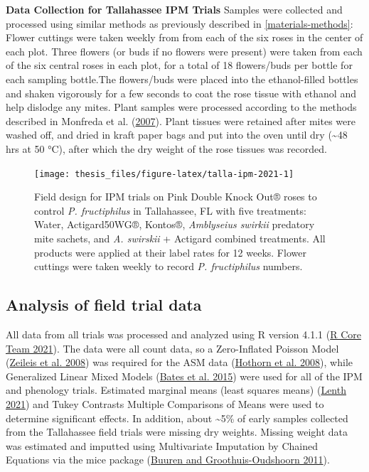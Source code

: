 \documentclass{ufdissertation}[overrideChapters] %
\begin{document}
{\textbf{Data Collection for Tallahassee IPM Trials}
Samples were collected and processed using similar methods as previously described in \ref{materials-methods}: Flower cuttings were taken weekly from from each of the six roses in the center of each plot. Three flowers (or buds if no flowers were present) were taken from each of the six central roses in each plot, for a total of 18 flowers/buds per bottle for each sampling bottle.The flowers/buds were placed into the ethanol-filled bottles and shaken vigorously for a few seconds to coat the rose tissue with ethanol and help dislodge any mites. Plant samples were processed according to the methods described in Monfreda et al. (\protect\hyperlink{ref-Monfreda2007}{2007}). Plant tissues were retained after mites were washed off, and dried in kraft paper bags and put into the oven until dry (\textasciitilde48 hrs at 50 °C), after which the dry weight of the rose tissues was recorded.
\begin{figure}

{\centering \texttt{[image: thesis\_files/figure-latex/talla-ipm-2021-1]} 

}

\caption[Field design for IPM trials on Pink Double Knock Out® roses to control \textit{P. fructiphilus} in Tallahassee, FL with five treatments]{Field design for IPM trials on Pink Double Knock Out® roses to control \textit{P. fructiphilus} in Tallahassee, FL with five treatments: Water, Actigard50WG®, Kontos®, \textit{Amblyseius swirkii} predatory mite sachets, and \textit{A. swirskii} + Actigard combined treatments. All products were applied at their label rates for 12 weeks. Flower cuttings were taken weekly to record \textit{P. fructiphilus} numbers.}\label{fig:talla-ipm-2021}
\end{figure}
\hypertarget{analysis-of-field-trial-data}{%
\subsection{Analysis of field trial data}\label{analysis-of-field-trial-data}}

All data from all trials was processed and analyzed using R version 4.1.1 (\protect\hyperlink{ref-RCT2021}{R Core Team 2021}). The data were all count data, so a Zero-Inflated Poisson Model (\protect\hyperlink{ref-Zeileis2008}{Zeileis et al. 2008}) was required for the ASM data (\protect\hyperlink{ref-Hothorn2008}{Hothorn et al. 2008}), while Generalized Linear Mixed Models (\protect\hyperlink{ref-Bates2015}{Bates et al. 2015}) were used for all of the IPM and phenology trials. Estimated marginal means (least squares means) (\protect\hyperlink{ref-Lenth2021}{Lenth 2021}) and Tukey Contrasts Multiple Comparisons of Means were used to determine significant effects. In addition, about \textasciitilde5\% of early samples collected from the Tallahassee field trials were missing dry weights. Missing weight data was estimated and imputted using Multivariate Imputation by Chained Equations via the mice package (\protect\hyperlink{ref-vanBuuren2011}{Buuren and Groothuis-Oudshoorn 2011}).

}
\end{document}
